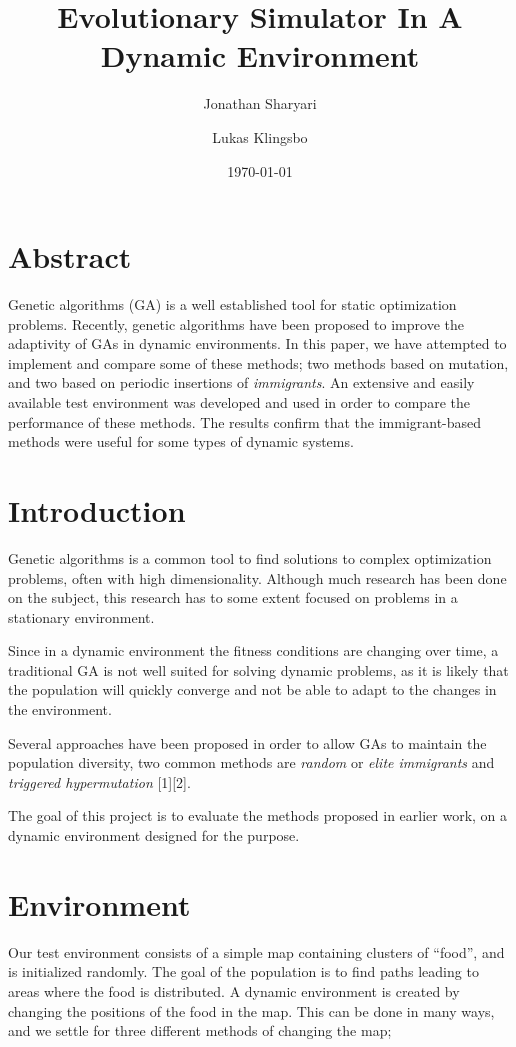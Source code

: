 \documentclass[a4paper,12pt]{article}
\title{\textbf{Evolutionary Simulator In A Dynamic Environment}}
\author{Jonathan Sharyari \and Lukas Klingsbo}  %
\date{\today}
\begin{document}
\maketitle

\section*{Abstract}
Genetic algorithms (GA) is a well established tool for static optimization problems. Recently, genetic algorithms have been proposed to improve the adaptivity of GAs in dynamic environments. In this paper, we have attempted to implement and compare some of these methods; two methods based on mutation, and two based on periodic insertions of \emph{immigrants}. An extensive and easily available test environment was developed and used in order to compare the performance of these methods. The results confirm that the immigrant-based methods were useful for some types of  dynamic systems.


\section{Introduction}
Genetic algorithms is a common tool to find solutions to complex optimization problems, often with high dimensionality. Although much research has been done on the subject, this research has to some extent focused on problems in a stationary environment.

Since in a dynamic environment the fitness conditions are changing over time, a traditional GA is not well suited for solving dynamic problems, as it is likely that the population will quickly converge and not be able to adapt to the changes in the environment.

Several approaches have been proposed in order to allow GAs to maintain the population diversity, two common methods are \emph{random} or \emph{elite immigrants} and \emph{triggered hypermutation} [1][2].

The goal of this project is to evaluate the methods proposed in earlier work, on a dynamic environment designed for the purpose.

\section{Environment}
Our test environment consists of a simple map containing clusters of ``food'', and is initialized randomly. The goal of the population is to find paths leading to areas where the food is distributed. A dynamic environment is created by changing the positions of the food in the map. This can be done in many ways, and we settle for three different methods of changing the map;
\end{document}
